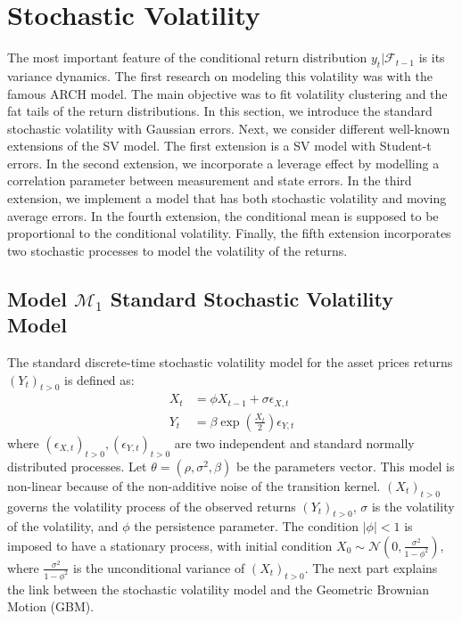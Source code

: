 \documentclass[11pt,a4,twosided,singlespacing,titlepagenumber=on]{scrreprt}
\numberwithin{equation}{chapter} %
\theoremstyle{remark}
\begin{document}
\chapter{Stochastic Volatility}
The most important feature of the conditional return distribution $y_t | \mathcal{F}_{t-1}$ is its variance dynamics. The first research on modeling this volatility was \cite{engle1982} with the famous ARCH model. The main objective was to fit volatility clustering and the fat tails of the return distributions.
In this section, we introduce the standard stochastic volatility with Gaussian errors. Next, we consider different well-known extensions of the SV model. The first extension is a SV model with Student-t errors. In the second extension, we incorporate a leverage effect by modelling a correlation parameter between measurement and state errors. In the third extension, we implement a model that has both stochastic volatility and moving average errors. In the fourth extension, the conditional mean is supposed to be proportional to the conditional volatility. Finally, the fifth extension incorporates two stochastic processes to model the volatility of the returns.

\section{Model $\mathcal{M}_1$ Standard Stochastic Volatility Model}
The standard discrete-time stochastic volatility model for the asset prices returns $(Y_t)_{t>0}$ is defined as:
\begin{align*}
  X_t &=  \phi X_{t-1} + \sigma \epsilon_{X,t} \\
  Y_t &=  \beta \exp \left( \frac{X_t}{2} \right) \epsilon_{Y,t}
\end{align*}
where $(\epsilon_{X,t})_{t>0},(\epsilon_{Y,t})_{t>0}$ are two independent and standard normally distributed processes. Let $\theta = (\rho, \sigma^2, \beta)$ be the parameters vector. This model is non-linear because of the non-additive noise of the transition kernel. $(X_t)_{t>0}$ governs the volatility process of the observed returns $(Y_t)_{t>0}$, $\sigma$ is the volatility of the volatility, and $\phi$ the persistence parameter. The condition $|\phi| < 1$  is imposed to have a stationary process, with initial condition $X_0 \sim \mathcal{N} \left(0, \frac{\sigma^2}{1-\phi^2} \right)$, where $\frac{\sigma^2}{1-\phi^2}$ is the unconditional variance of $(X_t)_{t>0}$. The next part explains the link between the stochastic volatility model and the Geometric Brownian Motion (GBM).
\end{document}
